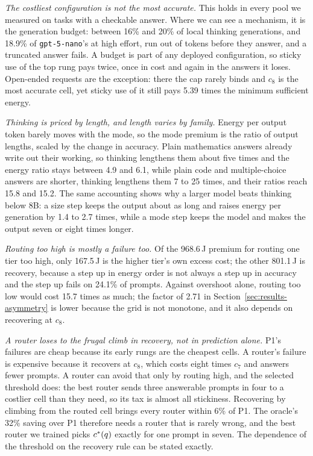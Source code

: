 \emph{The costliest configuration is not the most accurate.} This holds in
every pool we measured on tasks with a checkable answer. Where we can see a
mechanism, it is the generation budget: between 16\% and 20\% of local
thinking generations, and 18.9\% of \texttt{gpt-5-nano}'s at high effort, run
out of tokens before they answer, and a truncated answer fails. A budget is
part of any deployed configuration, so sticky use of the top rung pays twice,
once in cost and again in the answers it loses. Open-ended requests are the
exception: there the cap rarely binds and $c_8$ is the most accurate cell,
yet sticky use of it still pays 5.39 times the minimum sufficient energy.

\emph{Thinking is priced by length, and length varies by family.} Energy per
output token barely moves with the mode, so the mode premium is the ratio of
output lengths, scaled by the change in accuracy. Plain mathematics answers
already write out their working, so thinking lengthens them about five times
and the energy ratio stays between 4.9 and 6.1, while plain code and
multiple-choice answers are shorter, thinking lengthens them 7 to 25 times,
and their ratios reach 15.8 and 15.2. The same accounting shows why a larger
model beats thinking below 8B: a size step keeps the output about as long and
raises energy per generation by 1.4 to 2.7 times, while a mode step keeps the
model and makes the output seven or eight times longer.

\emph{Routing too high is mostly a failure too.} Of the 968.6\,J premium for
routing one tier too high, only 167.5\,J is the higher tier's own excess
cost; the other 801.1\,J is recovery, because a step up in energy order is
not always a step up in accuracy and the step up fails on 24.1\% of prompts.
Against overshoot alone, routing too low would cost 15.7 times as much; the
factor of 2.71 in Section~\ref{sec:results-asymmetry} is lower because the
grid is not monotone, and it also depends on recovering at $c_8$.

\emph{A router loses to the frugal climb in recovery, not in prediction
alone.} P1's failures are cheap because its early rungs are the cheapest
cells. A router's failure is expensive because it recovers at $c_8$, which
costs eight times $c_7$ and answers fewer prompts. A router can avoid that
only by routing high, and the selected threshold does: the best router sends
three answerable prompts in four to a costlier cell than they need, so its
tax is almost all stickiness. Recovering by climbing from the routed cell
brings every router within 6\% of P1. The oracle's 32\% saving over P1
therefore needs a router that is rarely wrong, and the best router we trained
picks $c^{*}(q)$ exactly for one prompt in seven. The dependence of the
threshold on the recovery rule can be stated exactly.

